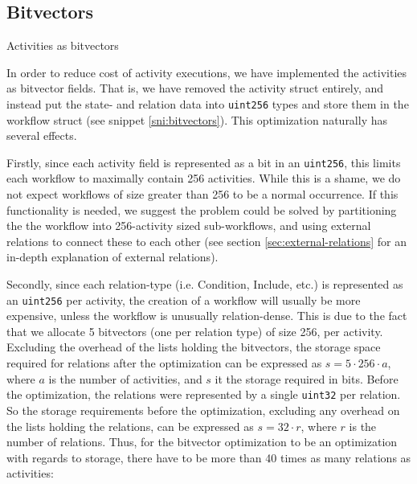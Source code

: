 \documentclass{article}
\begin{document}
		\subsection{Bitvectors}

		\begin{snippet}[ht!]
			\centering
			
		 	\caption[Activities as bitvectors]
		 	{Activities as bitvectors}
		 	\label{sni:bitvectors}
		\end{snippet}

		In order to reduce cost of activity executions, we have implemented the activities as bitvector fields. 
		That is, we have removed the activity struct entirely, and instead put the state- and relation data into \texttt{uint256} types and store them in the workflow struct (see snippet \ref{sni:bitvectors}).
		This optimization naturally has several effects.

		Firstly, since each activity field is represented as a bit in an \texttt{uint256}, this limits each workflow to maximally contain 256 activities. 
		While this is a shame, we do not expect workflows of size greater than 256 to be a normal occurrence.
		If this functionality is needed, we suggest the problem could be solved by partitioning the the workflow into 256-activity sized sub-workflows, and using external relations to connect these to each other (see section \ref{sec:external-relations} for an in-depth explanation of external relations).

		Secondly, since each relation-type (i.e. Condition, Include, etc.) is represented as an \texttt{uint256} per activity, the creation of a workflow will usually be more expensive, unless the workflow is unusually relation-dense. 
		This is due to the fact that we allocate 5 bitvectors (one per relation type) of size 256, per activity. 
		Excluding the overhead of the lists holding the bitvectors, the storage space required for relations after the optimization can be expressed as $s = 5 \cdot 256 \cdot a$, where $a$ is the number of activities, and $s$ it the storage required in bits.
		Before the optimization, the relations were represented by a single \texttt{uint32} per relation.
		So the storage requirements before the optimization, excluding any overhead on the lists holding the relations, can be expressed as $s = 32 \cdot r$, where $r$ is the number of relations.
		Thus, for the bitvector optimization to be an optimization with regards to storage, there have to be more than 40 times as many relations as activities:
\end{document}

